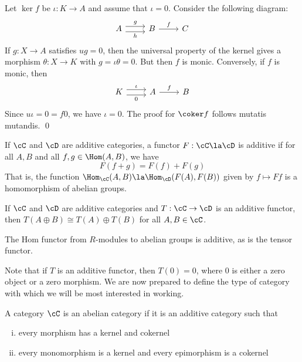 \pf Let $\ker f$ be $\iota: K \to A$ and assume that $\iota=0$. Consider the following diagram:
	\[
	\begin{tikzcd}
	A \arrow[yshift=0.75ex]{r}{g} \arrow[yshift= -0.75ex,swap]{r}{h} & B \arrow{r}{f} & C
	\end{tikzcd}
	\]
If $g: X \to A$ satisfies $ug=0$, then the universal property of the kernel gives a morphism $\theta: X \to K$ with $g=\iota\theta=0$. But then $f$ is monic. Conversely, if $f$ is monic, then 
	\[
	\begin{tikzcd}
	K \arrow[yshift=0.75ex]{r}{\iota} \arrow[yshift=-0.75ex,swap]{r}{0} & A \arrow{r}{f} & B
	\end{tikzcd}
	\]
Since $u\iota=0=f0$, we have $\iota=0$. The proof for $\coker f$ follows mutatis mutandis. \qed \\


\begin{dfn}
If $\cC$ and $\cD$ are additive categories, a functor $F: \cC \la \cD$ is additive if for all $A,B$ and all $f,g \in \Hom(A,B)$, we have
	\[
	F(f+g)=F(f)+F(g)
	\]
That is, the function $\Hom_{\cC}(A,B) \la \Hom_{\cD}(F(A),F(B))$ given by $f \mapsto Ff$ is a homomorphism of abelian groups. 
\end{dfn}


\begin{rem}
If $\cC$ and $\cD$ are additive categories and $T: \cC \to \cD$ is an additive functor, then $T(A \oplus B) \cong T(A) \oplus T(B)$ for all $A,B \in \cC$. 
\end{rem}


\begin{ex}
The Hom functor from $R$-modules to abelian groups is additive, as is the tensor functor. \xqed
\end{ex}


Note that if $T$ is an additive functor, then $T(0)=0$, where 0 is either a zero object or a zero morphism. We are now prepared to define the type of category with which we will be most interested in working.


\begin{dfn}
A category $\cC$ is an abelian category if it is an additive category such that 
	\begin{enumerate}[(i)]
	\item every morphism has a kernel and cokernel
	\item every monomorphism is a kernel and every epimorphism is a cokernel
	\end{enumerate}
\end{dfn}


